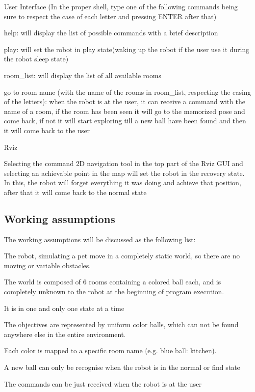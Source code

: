 \begin{DoxyItemize}
\item User Interface (In the proper shell, type one of the following commands being sure to respect the case of each letter and pressing E\+N\+T\+ER after that)
\begin{DoxyItemize}
\item help\+: will display the list of possible commands with a brief description
\item play\+: will set the robot in play state(waking up the robot if the user use it during the robot sleep state)
\item room\+\_\+list\+: will display the list of all available rooms
\item go to \textquotesingle{}room name\textquotesingle{} (with the name of the rooms in room\+\_\+list, respecting the casing of the letters)\+: when the robot is at the user, it can receive a command with the name of a room, if the room has been seen it will go to the memorized pose and come back, if not it will start exploring till a new ball have been found and then it will come back to the user
\end{DoxyItemize}
\item Rviz
\begin{DoxyItemize}
\item Selecting the command 2D navigation tool in the top part of the Rviz G\+UI and selecting an achievable point in the map will set the robot in the recovery state. In this, the robot will forget everything it was doing and achieve that position, after that it will come back to the normal state
\end{DoxyItemize}
\end{DoxyItemize}

\subsection*{Working assumptions}

The working assumptions will be discussed as the following list\+:
\begin{DoxyItemize}
\item The robot, simulating a pet move in a completely static world, so there are no moving or variable obstacles.
\item The world is composed of 6 rooms containing a colored ball each, and is completely unknown to the robot at the beginning of program execution.
\item It is in one and only one state at a time
\item The objectives are represented by uniform color balls, which can not be found anywhere else in the entire environment.
\item Each color is mapped to a specific room name (e.\+g. blue ball\+: kitchen).
\item A new ball can only be recognise when the robot is in the normal or find state
\item The commands can be just received when the robot is at the user
\end{DoxyItemize}

